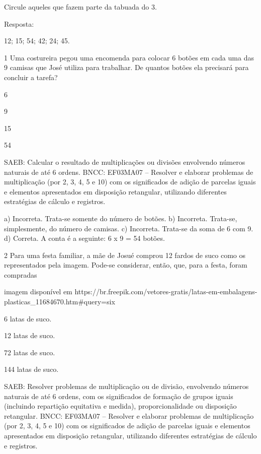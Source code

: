 \begin{escolha}
Circule aqueles que fazem parte da tabuada do 3.

Resposta:

12; 15; 54; 42; 24; 45.


\num{1} Uma costureira pegou uma encomenda para colocar 6 botões em
cada uma das 9 camisas que José utiliza para trabalhar. De quantos botões
ela precisará para concluir a tarefa?

\begin{escolha}
    \item 6
    \item 9
    \item 15
    \item 54
\end{escolha}

SAEB: Calcular o resultado de multiplicações ou divisões envolvendo números naturais de até 6 ordens.
BNCC: EF03MA07 – Resolver e elaborar problemas de multiplicação (por 2, 3, 4, 5 e 10) com os
significados de adição de parcelas iguais e elementos apresentados em disposição retangular,
utilizando diferentes estratégias de cálculo e registros.


a) Incorreta. Trata-se somente do número de botões.
b) Incorreta. Trata-se, simplesmente, do número de camisas.
c) Incorreta. Trata-se da soma de 6 com 9.
d) Correta. A conta é a seguinte: 6 x 9 = 54 botões.

\num{2} Para uma festa familiar, a mãe de Josué comprou 12 fardos de
suco como os representados pela imagem. Pode-se considerar, então, que, para a festa, foram compradas

\Incluir imagem disponível em https://br.freepik.com/vetores-gratis/latas-em-embalagens-plasticas_11684670.htm#query=six%

\begin{escolha}

\item
  6 latas de suco.
\item
  12 latas de suco.
\item
  72 latas de suco.
\item
  144 latas de suco.
\end{escolha}

SAEB: Resolver problemas de multiplicação ou de divisão, envolvendo números naturais de até 6 ordens, com os significados de formação de grupos iguais (incluindo repartição equitativa e medida), proporcionalidade ou disposição retangular.
BNCC: EF03MA07 – Resolver e elaborar problemas de multiplicação (por 2, 3, 4, 5 e 10) com os
significados de adição de parcelas iguais e elementos apresentados em disposição retangular,
utilizando diferentes estratégias de cálculo e registros.



\end{escolha}
